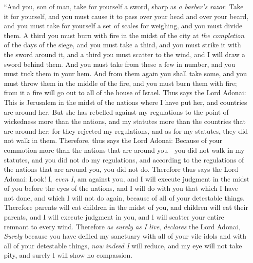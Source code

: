 \begin{biblechapter} %
\verse “And you, son of man, take for yourself a sword, sharp as \textit{a barber’s razor}. Take it for yourself, and you must cause it to pass over your head and over your beard, and you must take for yourself a set of scales for weighing, and you must divide them.
\verse A third you must burn with fire in the midst of the city at \textit{the completion} of the days of the siege, and you must take a third, and you must strike it with the sword around it, and a third you must scatter to the wind, and I will draw a sword behind them.
\verse And you must take from these a few in number, and you must tuck them in your hem.
\verse And from them again you shall take some, and you must throw them in the middle of the fire, and you must burn them with fire; from it a fire will go out to all of the house of Israel.
\verse Thus says the Lord Adonai: This is Jerusalem in the midst of the nations where I have put her, and countries are around her.
\verse But she has rebelled against my regulations to the point of wickedness more than the nations, and my statutes more than the countries that are around her; for they rejected my regulations, and as for my statutes, they did not walk in them.
\verse Therefore, thus says the Lord Adonai: Because of your commotion more than the nations that are around you—you did not walk in my statutes, and you did not do my regulations, and according to the regulations of the nations that are around you, you did not do.
\verse Therefore thus says the Lord Adonai: Look! I, \textit{even I}, am against you, and I will execute judgment in the midst of you before the eyes of the nations,
\verse and I will do with you that which I have not done, and which I will not do again, because of all of your detestable things.
\verse Therefore parents will eat children in the midst of you, and children will eat their parents, and I will execute judgment in you, and I will scatter your entire remnant to every wind.
\verse Therefore \textit{as surely as I live}, \textit{declares} the Lord Adonai, \textit{Surely} because you have defiled my sanctuary with all of your vile idols and with all of your detestable things, \textit{now indeed I} will reduce, and my eye will not take pity, and surely I will show no compassion.

\end{biblechapter}
